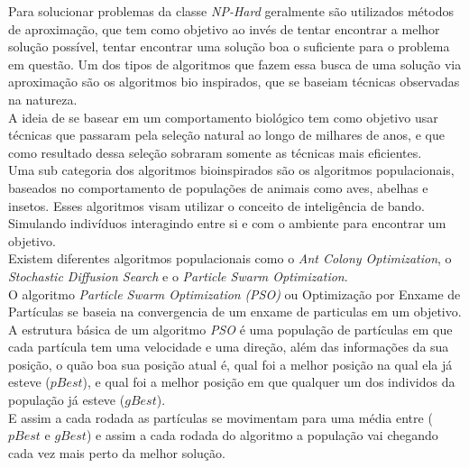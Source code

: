 Para solucionar problemas da classe \textit{NP-Hard} geralmente são utilizados métodos de aproximação, que tem como objetivo ao invés de tentar encontrar a melhor solução possível, tentar encontrar uma solução boa o suficiente para o problema em questão.
Um dos tipos de algoritmos que fazem essa busca de uma solução via aproximação são os algoritmos bio inspirados, que se baseiam técnicas observadas na natureza.\\
\indent A ideia de se basear em um comportamento biológico tem como objetivo usar técnicas que passaram pela seleção natural ao longo de milhares de anos, e que como resultado dessa seleção sobraram somente as técnicas mais eficientes.\\

Uma sub categoria dos algoritmos bioinspirados são os algoritmos populacionais, baseados no comportamento de populações de animais como aves, abelhas e insetos.
Esses algoritmos visam utilizar o conceito de inteligência de bando. Simulando indivíduos interagindo entre si e com o ambiente para encontrar um objetivo.\\
Existem diferentes algoritmos populacionais como o \textit{Ant Colony Optimization}, o \textit{Stochastic Diffusion Search} e o \textit{Particle Swarm Optimization}.\\

O algoritmo \textit{Particle Swarm Optimization} \textit{(PSO)} ou Optimização por Enxame de Partículas se baseia na convergencia de um enxame de particulas em um objetivo.\\
A estrutura básica de um algoritmo \textit{PSO} é uma população de partículas em que cada partícula tem uma velocidade e uma direção, além das informações da sua posição, o quão boa sua posição atual é, qual foi a melhor posição na qual ela já esteve ($pBest$), e qual foi a melhor posição em que qualquer um dos individos da população já esteve ($gBest$).\\
E assim a cada rodada as partículas se movimentam para uma média entre ($pBest$ e $gBest$) e assim a cada rodada do algoritmo a população vai chegando cada vez mais perto da melhor solução.





